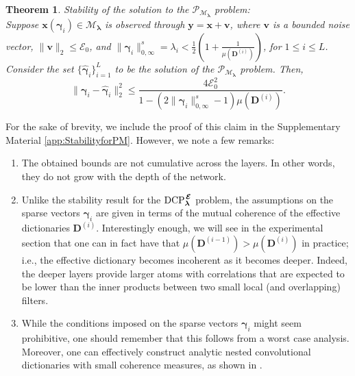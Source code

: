 \documentclass[10pt,journal]{IEEEtran}
\def\x{{\mathbf x}}
\def\v{{\mathbf v}}
\def\y{{\mathbf y}}
\def\D{{\mathbf D}}
\def\M{{\mathcal{M}}}
\def\P{{\mathcal{P}}}
\def\gama{{\boldsymbol \gamma}}
\def\lamda{{\boldsymbol \lambda}}
\def\vps{{\bm{\mathbf{\mathcal{E}}}}}
\def\DCPE{{\text{DCP}_\lamda^{\hspace{0.04cm} \vps}}}
\def\PM{{\P_{\M_\lamda}}}
\theoremstyle{plain}
\newtheorem{thm}{Theorem} %
\theoremstyle{definition}
\begin{document}
\begin{thm}{ Stability of the solution to the $\PM$ problem:} \label{Thm:GlobalStability} \\
	Suppose $\x(\gama_i) \in \M_\lamda$ is observed through $\y = \x+ \v$, where $\v$ is a bounded noise vector, $\|\v\|_2 \leq \mathcal{E}_0$, and %
	$\|\gama_i\|^s_{0,\infty} = \lambda_i < \frac{1}{2}\left(1+\frac{1}{\mu(\D^{(i)})}\right)$, for $1\leq i \leq L$. Consider the set $\{\hat{\gama}_i\}_{i=1}^{L}$ to be the solution of the $\PM$ problem. Then,
	\begin{equation} \label{Eq:DCPEStability}
	\| \gama_i- \hat{\gama}_i \|_2^2 \leq \frac{4\mathcal{E}_{0}^2}{1-(2\|\gama_{i}\|^s_{0,\infty}-1)\mu(\D^{(i)})}.
	\end{equation}
\end{thm}
For the sake of brevity, we include the proof of this claim in the Supplementary Material \ref{app:StabilityforPM}. However, we note a few remarks:
\begin{enumerate}

	\item The obtained bounds are not cumulative across the layers. In other words, they do not grow with the depth of the network.
 
	\item Unlike the stability result for the $\DCPE$ problem, the assumptions on the sparse vectors $\gama_i$ are given in terms of the mutual coherence of the effective dictionaries $\D^{(i)}$. Interestingly enough, we will see in the experimental section that one can in fact have that $\mu(\D^{(i-1)}) > \mu(\D^{(i)})$ in practice; i.e., the effective dictionary becomes incoherent as it becomes deeper. Indeed, the deeper layers provide larger atoms with correlations that are expected to be lower than the inner products between two small local (and overlapping) filters.

	\item While the conditions imposed on the sparse vectors $\gama_i$ might seem prohibitive, one should remember that this follows from a worst case analysis. Moreover, one can effectively construct analytic nested convolutional dictionaries with small coherence measures, as shown in \cite{Papyan2016convolutional}.

\end{enumerate}
\end{document}
